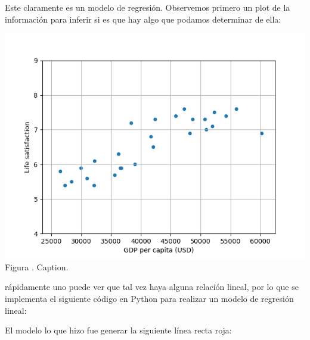 \documentclass[12pt]{report}
\theoremstyle{largebreak}
\newcounter{figcount}
\begin{document}
    \begin{sol}
        Este claramente es un modelo de regresión. Observemos primero un plot de la información para inferir si es que hay algo que podamos determinar de ella:

        \begin{minipage}{\textwidth}
            \begin{center}
                \includegraphics[scale=0.7]{images/plot_1.png}\\
                Figura \thefigcount. Caption.
            \end{center}
        \end{minipage}

        rápidamente uno puede ver que tal vez haya alguna relación lineal, por lo que se implementa el siguiente código en Python para realizar un modelo de regresión lineal:
        
        

        El modelo lo que hizo fue generar la siguiente línea recta roja:


\end{sol}
\end{document}
